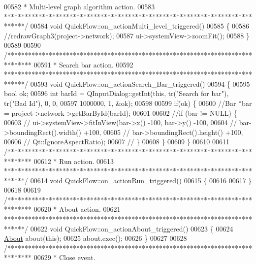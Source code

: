 \begin{DoxyCode}
00582 \textcolor{comment}{ *  Multi-level graph algorithm action.}
00583 \textcolor{comment}{ ******************************************************************************/}
00584 \textcolor{keywordtype}{void} QuickFlow::on\_actionMulti\_level\_triggered()
00585 \{
00586   \textcolor{comment}{//redrawGraph3(project->network);}
00587   ui->systemView->zoomFit();
00588 \}
00589 
00590 \textcolor{comment}{/*******************************************************************************}
00591 \textcolor{comment}{ * Search bar action.}
00592 \textcolor{comment}{ ******************************************************************************/}
00593 \textcolor{keywordtype}{void} QuickFlow::on\_actionSearch\_Bar\_triggered()
00594 \{
00595   \textcolor{keywordtype}{bool} ok;
00596   \textcolor{keywordtype}{int} barId = QInputDialog::getInt(\textcolor{keyword}{this}, tr(\textcolor{stringliteral}{"Search for bar"}), tr(\textcolor{stringliteral}{"Bad Id"}), 0, 0,
00597                                    1000000, 1, &ok);
00598 
00599   \textcolor{keywordflow}{if}(ok) \{
00600     \textcolor{comment}{//Bar *bar = project->network->getBarById(barId);}
00601 
00602     \textcolor{comment}{//if (bar != NULL) \{}
00603 \textcolor{comment}{//      ui->systemView->fitInView(bar->x() -100, bar->y() -100,}
00604 \textcolor{comment}{//                                bar->boundingRect().width() +100,}
00605 \textcolor{comment}{//                                bar->boundingRect().height() +100,}
00606 \textcolor{comment}{//                                Qt::IgnoreAspectRatio);}
00607 \textcolor{comment}{//    \}}
00608   \}
00609 \}
00610 
00611 \textcolor{comment}{/*******************************************************************************}
00612 \textcolor{comment}{ * Run action.}
00613 \textcolor{comment}{ ******************************************************************************/}
00614 \textcolor{keywordtype}{void} QuickFlow::on\_actionRun\_triggered()
00615 \{
00616 
00617 \}
00618 
00619 \textcolor{comment}{/*******************************************************************************}
00620 \textcolor{comment}{ * About action.}
00621 \textcolor{comment}{ ******************************************************************************/}
00622 \textcolor{keywordtype}{void} QuickFlow::on\_actionAbout\_triggered()
00623 \{
00624   \hyperlink{class_about}{About} about(\textcolor{keyword}{this});
00625   about.exec();
00626 \}
00627 
00628 \textcolor{comment}{/*******************************************************************************}
00629 \textcolor{comment}{ * Close event.}

\end{DoxyCode}
